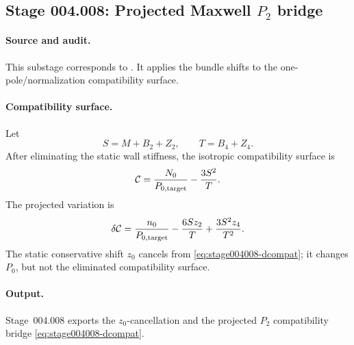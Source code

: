 \subsection*{Stage 004.008: Projected Maxwell \(P_2\) bridge}
\label{subsec:stage004008-projected-maxwell-p2-bridge}

\paragraph{Source and audit.}
This substage corresponds to
.
It applies the bundle shifts to the one-pole/normalization compatibility
surface.

\paragraph{Compatibility surface.}
Let
\begin{equation}
\label{eq:stage004008-compat-base}
S=M+B_2+Z_2,\qquad T=B_4+Z_4 .
\end{equation}
After eliminating the static wall stiffness, the isotropic compatibility
surface is
\begin{equation}
\label{eq:stage004008-compat}
\mathcal C=\frac{N_0}{P_{0,\rm target}}-\frac{3S^2}{T}.
\end{equation}
The projected variation is
\begin{equation}
\label{eq:stage004008-dcompat}
\delta\mathcal C
=\frac{n_0}{P_{0,\rm target}}
-\frac{6Sz_2}{T}
+\frac{3S^2z_4}{T^2}.
\end{equation}
The static conservative shift \(z_0\) cancels from
\eqref{eq:stage004008-dcompat}; it changes \(P_0\), but not the eliminated
compatibility surface.

\paragraph{Output.}
Stage~004.008 exports the \(z_0\)-cancellation and the projected \(P_2\)
compatibility bridge \eqref{eq:stage004008-dcompat}.
